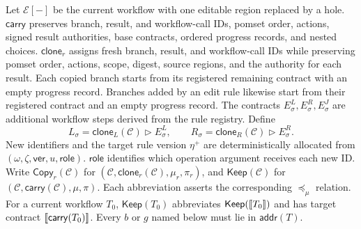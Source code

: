 Let \(\mathcal E[-]\) be the current workflow with one editable region replaced by a hole.
\(\mathsf{carry}\) preserves branch, result, and workflow-call IDs, pomset order, actions, signed result authorities, base contracts, ordered progress records, and nested choices.
\(\mathsf{clone}_r\) assigns fresh branch, result, and workflow-call IDs while preserving pomset order, actions, scope, digest, source regions, and the authority for each result.
Each copied branch starts from its registered remaining contract with an empty progress record.
Branches added by an edit rule likewise start from their registered contract and an empty progress record.
The contracts \(E_\sigma^L,E_\sigma^R,E_\sigma^J\) are additional workflow steps derived from the rule registry.
Define
\[
 L_\sigma=\mathsf{clone}_L(\mathcal C)\triangleright E_\sigma^L,\qquad
 R_\sigma=\mathsf{clone}_R(\mathcal C)\triangleright E_\sigma^R .
\]
New identifiers and the target rule version \(\eta^+\) are deterministically allocated from \((\omega,\zeta,\mathsf{ver},u,\mathsf{role})\).
\(\mathsf{role}\) identifies which operation argument receives each new ID.
Write \(\mathsf{Copy}_r(\mathcal C)\) for \((\mathcal C,\mathsf{clone}_r(\mathcal C),\mu_r,\pi_r)\), and \(\mathsf{Keep}(\mathcal C)\) for \((\mathcal C,\mathsf{carry}(\mathcal C),\mu,\pi)\).
Each abbreviation asserts the corresponding \(\preccurlyeq_\mu\) relation.
For a current workflow \(T_0\), \(\mathsf{Keep}(T_0)\) abbreviates \(\mathsf{Keep}(\mathopen{[\![}T_0\mathclose{]\!]})\) and has target contract \(\mathopen{[\![}\mathsf{carry}(T_0)\mathclose{]\!]}\).
Every \(b\) or \(g\) named below must lie in \(\mathsf{addr}(T)\).

